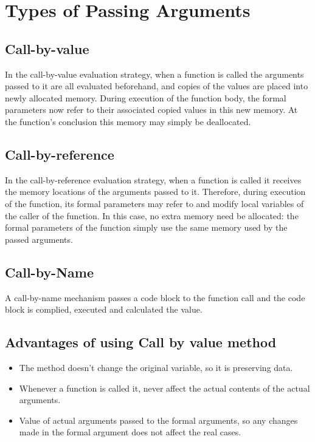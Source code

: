 \documentclass[12pt]{article}
\begin{document}
\tableofcontents

\newpage

\section{Types of Passing Arguments}

\subsection{Call-by-value}

In the call-by-value evaluation strategy, when a function is called the arguments passed to it are all evaluated beforehand, and copies of the values are placed into newly allocated memory. During execution of the function body, the formal parameters now refer to their associated copied values in this new memory. At the function’s conclusion this memory may simply be deallocated.

\subsection{Call-by-reference}

In the call-by-reference evaluation strategy, when a function is called it receives the memory locations of the arguments passed to it. Therefore, during execution
of the function, its formal parameters may refer to and modify local variables of the caller of the function. In this case, no extra memory need be allocated:
the formal parameters of the function simply use the same memory used by the passed arguments.


\subsection{Call-by-Name}

A call-by-name mechanism passes a code block to the function call and the code block is complied, executed and calculated the value.




\subsection{Advantages of using Call by value method}

\begin{itemize}
	\item The method doesn't change the original variable, so it is preserving data.
	\item Whenever a function is called it, never affect the actual contents of the actual arguments.
	\item Value of actual arguments passed to the formal arguments, so any changes made in the formal argument does not affect the real cases.
\end{itemize}
\end{document}
